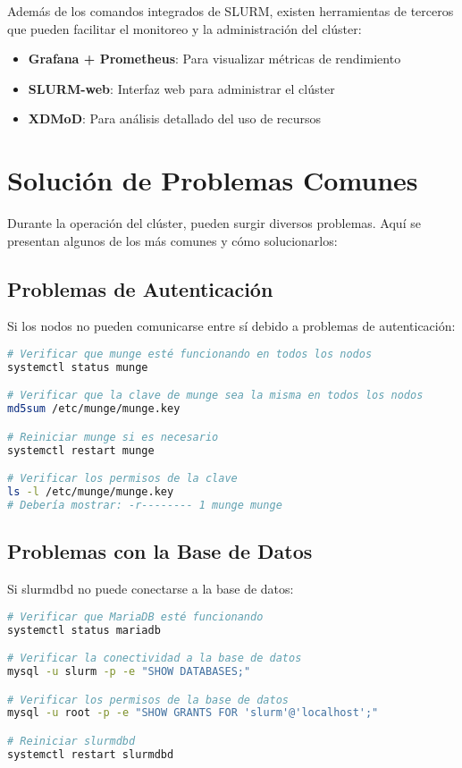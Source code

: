 \documentclass[12pt,a4paper]{article}
\begin{document}
\begin{infobox}
Además de los comandos integrados de SLURM, existen herramientas de terceros que pueden facilitar el monitoreo y la administración del clúster:
\begin{itemize}
    \item \textbf{Grafana + Prometheus}: Para visualizar métricas de rendimiento
    \item \textbf{SLURM-web}: Interfaz web para administrar el clúster
    \item \textbf{XDMoD}: Para análisis detallado del uso de recursos
\end{itemize}
\end{infobox}

\section{Solución de Problemas Comunes}

Durante la operación del clúster, pueden surgir diversos problemas. Aquí se presentan algunos de los más comunes y cómo solucionarlos:

\subsection{Problemas de Autenticación}

Si los nodos no pueden comunicarse entre sí debido a problemas de autenticación:

\begin{lstlisting}[language=bash, caption=Solución de problemas de autenticación]
# Verificar que munge esté funcionando en todos los nodos
systemctl status munge

# Verificar que la clave de munge sea la misma en todos los nodos
md5sum /etc/munge/munge.key

# Reiniciar munge si es necesario
systemctl restart munge

# Verificar los permisos de la clave
ls -l /etc/munge/munge.key
# Debería mostrar: -r-------- 1 munge munge
\end{lstlisting}

\subsection{Problemas con la Base de Datos}

Si slurmdbd no puede conectarse a la base de datos:

\begin{lstlisting}[language=bash, caption=Solución de problemas de base de datos]
# Verificar que MariaDB esté funcionando
systemctl status mariadb

# Verificar la conectividad a la base de datos
mysql -u slurm -p -e "SHOW DATABASES;"

# Verificar los permisos de la base de datos
mysql -u root -p -e "SHOW GRANTS FOR 'slurm'@'localhost';"

# Reiniciar slurmdbd
systemctl restart slurmdbd
\end{lstlisting}
\end{document}
